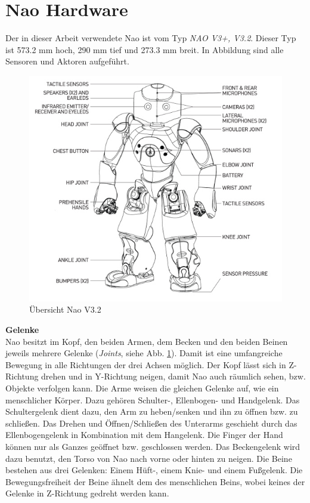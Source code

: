 \section{Nao Hardware}
\label{nao:hardware}
Der in dieser Arbeit verwendete Nao ist vom Typ \textit{NAO V3+, V3.2}. Dieser Typ ist 573.2 mm hoch, 290 mm tief und 273.3 mm breit. In Abbildung  sind alle Sensoren und Aktoren aufgeführt.
\\
\begin{figure}[H]						
	\centering							
	\includegraphics[scale=0.9]{Bilder/nao_overview.jpg}			
	\caption{Übersicht Nao V3.2}						
	\label{f:nao_ov}						
\end{figure}
\noindent
\textbf{Gelenke}
\\
Nao besitzt  im Kopf, den beiden Armen, dem Becken und den beiden Beinen jeweils mehrere Gelenke (\textit{Joints}, siehe Abb. \ref{f:nao_ov}). Damit ist eine umfangreiche Bewegung in alle Richtungen der drei Achsen möglich. Der Kopf lässt sich in Z-Richtung drehen und in Y-Richtung neigen, damit Nao auch räumlich sehen, bzw. Objekte verfolgen kann.
Die Arme weisen die gleichen Gelenke auf, wie ein menschlicher Körper. Dazu gehören Schulter-, Ellenbogen- und Handgelenk. Das Schultergelenk dient dazu, den Arm zu heben/senken und ihn zu öffnen bzw. zu schließen. Das Drehen und Öffnen/Schließen des Unterarms geschieht durch das Ellenbogengelenk in Kombination mit dem Hangelenk. Die Finger der Hand können nur als Ganzes geöffnet bzw. geschlossen werden.
Das Beckengelenk wird dazu benutzt, den Torso von Nao nach vorne oder hinten zu neigen.
Die Beine bestehen aus drei Gelenken: Einem Hüft-, einem Knie- und einem Fußgelenk. Die Bewegungsfreiheit der Beine ähnelt dem des menschlichen Beins, wobei keines der Gelenke in Z-Richtung gedreht werden kann.


